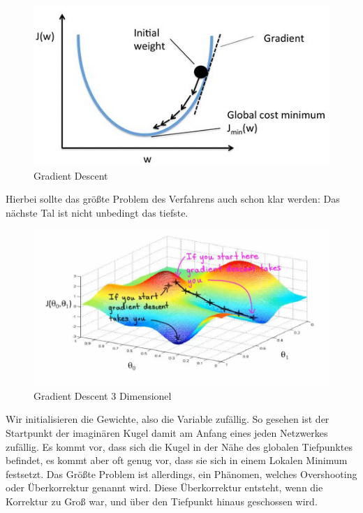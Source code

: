 \documentclass[12pt]{article}
\begin{document}
\begin{figure}[H]
\centering
\includegraphics[scale=0.70]{./Images/Pasted image 20230915145401.png}
\caption{Gradient Descent}
\label{Gradient Descent}
\end{figure}
Hierbei sollte das größte Problem des Verfahrens auch schon klar werden: Das nächste Tal ist nicht unbedingt das tiefste.
\begin{figure}[H]
\centering
\includegraphics[scale=0.40]{./Images/Pasted image 20230915223421.png}
\caption{Gradient Descent 3 Dimensionel}
\label{Gradient Descent 3 Dimensionel}
\end{figure}
Wir initialisieren die Gewichte, also die Variable zufällig. So gesehen ist der Startpunkt der imaginären Kugel damit am Anfang eines jeden Netzwerkes zufällig. Es kommt vor, dass sich die Kugel in der Nähe des globalen Tiefpunktes befindet, es kommt aber oft genug vor, dass sie sich in einem Lokalen Minimum festsetzt. 
Das Größte Problem ist allerdings, ein Phänomen, welches Overshooting oder Überkorrektur genannt wird. Diese Überkorrektur entsteht, wenn die Korrektur zu Groß war, und über den Tiefpunkt hinaus geschossen wird.
\end{document}
